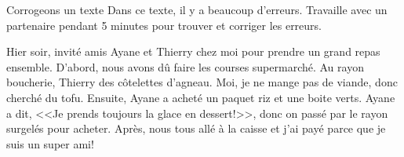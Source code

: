 \documentclass{beamer}
\subtitle[Atelier d'écriture et rédaction) et rayons]{L'atelier d'écriture et la rédaction}
\begin{document}
  \begin{frame}{Corrogeons un texte}
    Dans ce texte, il y a beaucoup d'erreurs.
    Travaille avec un partenaire pendant 5 minutes pour trouver et corriger les erreurs. \\
    \begin{block}{}
      Hier soir,
      invité
      amis Ayane et Thierry chez moi pour prendre un grand repas ensemble.
      D'abord, nous avons dû
      faire les courses
      supermarché.
      Au rayon boucherie, Thierry
      des côtelettes d'agneau.
      Moi, je ne mange pas de
      viande, donc
      cherché du tofu.
      Ensuite, Ayane a acheté un paquet
      riz et une boite
      verts.
      Ayane a dit, <<Je prends toujours
      la glace en dessert!>>, donc on
      passé par le rayon surgelés pour
      acheter.
      Après, nous
      tous
        allé
      à la caisse et j'ai payé parce que je suis un super ami!
    \end{block}
  \end{frame}
\end{document}
